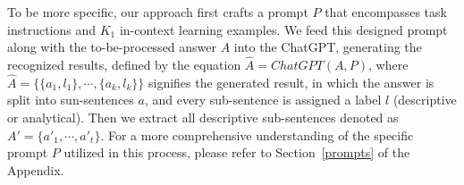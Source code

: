 To be more specific, our approach first crafts a prompt $P$ that encompasses task instructions and $K_1$ in-context learning examples. We feed this designed prompt along with the to-be-processed answer $A$ into the ChatGPT, generating the recognized results, defined by the equation 
$\hat{A} = ChatGPT(A, P)$, 
where $\hat{A}=\{\{a_1,l_1\},\cdots,\{a_k,l_k\}\}$ signifies the generated result, in which the answer is split into sun-sentences $a$, and every sub-sentence is assigned a label $l$ (\ie descriptive or analytical). Then we extract all descriptive sub-sentences denoted as $A'=\{a'_1,\cdots,a'_t\}$. For a more comprehensive understanding of the specific prompt $P$ utilized in this process, please refer to Section~\ref{prompts} of the Appendix.

         

